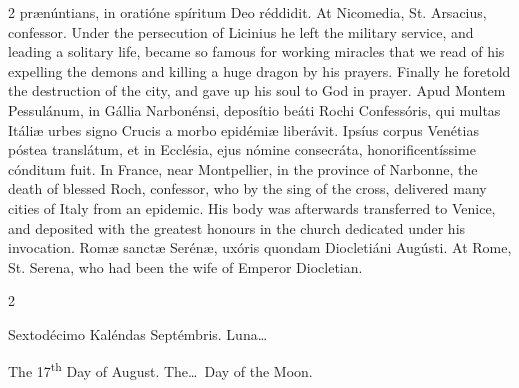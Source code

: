 \begin{paracol}{2}
 prænúntians, in oratióne spíritum Deo réddidit.
\switchcolumn
{}
At Nicomedia, St. Arsacius, 
 confessor. Under the persecution of Licinius he left the military 
 service, and leading a solitary life, became so famous for working miracles 
 that we read of his expelling the demons and killing a huge dragon by his 
 prayers. Finally he foretold the destruction of the city, and gave up 
 his soul to God in prayer.
\switchcolumn*
{}
Apud Montem Pessulánum, 
 in Gállia Narbonénsi, deposítio beáti Rochi Confessóris, qui multas Itáliæ 
 urbes signo Crucis a morbo epidémiæ liberávit. Ipsíus corpus Venétias 
 póstea translátum, et in Ecclésia, ejus nómine consecráta, 
 honorificentíssime cónditum fuit.
\switchcolumn
{}
In France, near Montpellier, in the 
 province of Narbonne, the death of blessed Roch, confessor, who by the sing 
 of the cross, delivered many cities of Italy from an epidemic. His 
 body was afterwards transferred to Venice, and deposited with the greatest 
 honours in the church dedicated under his invocation.
\switchcolumn*
{}
Romæ sanctæ Serénæ, 
 uxóris quondam Diocletiáni Augústi.
\switchcolumn
{}
At Rome, St. Serena, who had been 
 the wife of Emperor Diocletian.
\switchcolumn*
{}
\end{paracol}


\begin{paracol}{2}
\begin{center}{\color{gregoriocolor} Sextodécimo Kaléndas Septémbris. 
 Luna\dots\ }\end{center}
\switchcolumn
{}
\begin{center}{\color{gregoriocolor} The 
 17\textsuperscript{th} Day of 
 August. The\dots\ Day of the Moon.}\end{center}
\end{paracol}

